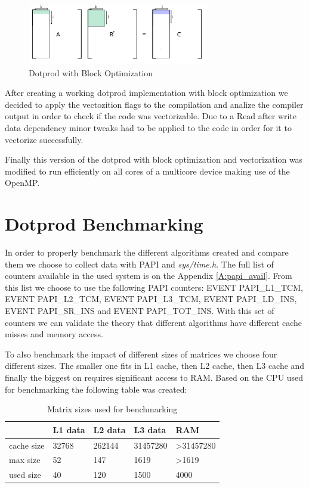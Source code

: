 \documentclass[a4paper]{report}
\begin{document}
\begin{figure}[H]
    \centering
        \includegraphics[width=0.7\textwidth]{images/matrix_mult_block.png}
        \caption{Dotprod with Block Optimization}
\end{figure}

After creating a working dotprod implementation with block optimization we
decided to apply the vectozition flags to the compilation and analize the
compiler output in order to check if the code was vectorizable. Due to a Read
after write data dependency minor tweaks had to be applied to the code in order
for it to vectorize successfully.

Finally this version of the dotprod with block optimization and vectorization
was modified to run efficiently on all cores of a multicore device making use of
the OpenMP.



\chapter{Dotprod Benchmarking}
In order to properly benchmark the different algorithms created and compare them
we choose to collect data with PAPI and \textit{sys/time.h}. The full list of
counters available in the used system is on the Appendix \ref{A:papi_avail}. From
this list we choose to use the following PAPI counters: EVENT PAPI\_L1\_TCM, EVENT
PAPI\_L2\_TCM, EVENT PAPI\_L3\_TCM, EVENT PAPI\_LD\_INS, EVENT PAPI\_SR\_INS and
EVENT PAPI\_TOT\_INS. With this set of counters we can validate the theory that
different algorithms have different cache misses and memory access.

To also benchmark the impact of different sizes of matrices we choose four
different sizes. The smaller one fits in L1 cache, then L2 cache, then L3 cache
and finally the biggest on requires significant access to RAM. Based on the CPU
used for benchmarking the following table was created:

\begin{table}[H]
\centering
\begin{tabular}{|l|l|l|l|l|}
\hline
           & L1 data & L2 data & L3 data  & RAM                    \\ \hline
cache size & 32768   & 262144  & 31457280 & \textgreater{}31457280 \\ \hline
max size   & 52      & 147     & 1619     & \textgreater{}1619     \\ \hline
used size  & 40      & 120     & 1500     & 4000                   \\ \hline
\end{tabular}
\caption{Matrix sizes used for benchmarking}
\end{table}
\end{document}
